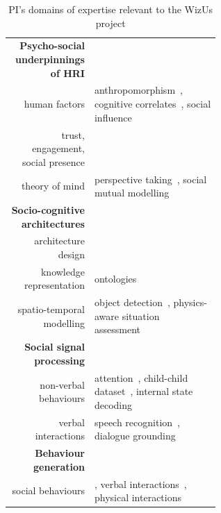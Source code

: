 \documentclass[11pt,a4paper]{report}
\newcommand{\project}{WizUs\xspace}
\begin{document}
\begin{table}[h]
    \centering
    \caption{\small PI's domains of expertise relevant to the \project project}
    \begin{tabular}{rp{0.6\linewidth}}
        \toprule
        \textbf{Psycho-social underpinnings of HRI} \\  
        human factors & \small anthropomorphism~\cite{lemaignan2014dynamics}, cognitive
        correlates~\cite{lemaignan2014cognitive}, social influence~\cite{winkle2019effective} \\
        trust, engagement, social presence & \small \cite{flook2019impact,lemaignan2015youre,fink2014which,irfan2018social} \\
        theory of mind & \small perspective taking~\cite{ros2010which, warnier2012when}, social mutual modelling~\cite{lemaignan2015mutual,dillenbourg2016symmetry} \\
        \midrule
        \textbf{Socio-cognitive architectures} \\
        architecture design & \small \cite{lemaignan2017artificial, baxter2016cognitive,lemaignan2014challenges,lallee2012towards, mallet2010genom3} \\
        knowledge representation & \small
        ontologies~\cite{lemaignan2010oro, lemaignan2013explicit} \\    
        spatio-temporal modelling & \small object
        detection~\cite{wallbridge2017qualitative}, physics-aware situation
        assessment~\cite{lemaignan2018underworlds,sallami2019simulation} \\
        \midrule
        \textbf{Social signal processing}\\
        non-verbal behaviours & \small attention~\cite{lemaignan2016realtime},
        child-child dataset~\cite{lemaignan2018pinsoro}, internal state decoding~\cite{bartlett2019what} \\
        verbal interactions & \small speech recognition~\cite{kennedy2017child}, dialogue grounding~\cite{lemaignan2011grounding} \\
        \midrule
        \textbf{Behaviour generation} \\
        social behaviours & \small \cite{lallee2011towards}, verbal interactions~\cite{wallbridge2019generating, wallbridge2019towards}, physical interactions~\cite{gharbi2013natural} \\

\end{tabular}
\end{table}
\end{document}
